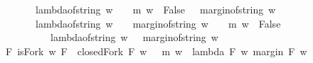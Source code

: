 \begin{isabellebody}
\ \ \ \ \ {\isasymand}\ \ \ {\isacharparenleft}lambda{\isacharunderscore}of{\isacharunderscore}string\ w\ {\isacharequal}\ {}\ {\isasymlongrightarrow}\ {\isacharparenleft}m\ {\isacharparenleft}w\ {\isacharat}\ {\isacharbrackleft}False{\isacharbrackright}{\isacharparenright}\ {\isacharequal}\ {\isacharparenleft}{}{\isacharcomma}\ margin{\isacharunderscore}of{\isacharunderscore}string\ w\ {\isacharminus}\ {}{\isacharparenright}{\isacharparenright}{\isacharparenright}\isanewline
\ \ \ \ \ {\isasymand}\ \ \ {\isacharparenleft}lambda{\isacharunderscore}of{\isacharunderscore}string\ w\ {\isachargreater}\ {}\ {\isasymand}\ margin{\isacharunderscore}of{\isacharunderscore}string\ w\ {\isasymnoteq}\ {}\ {\isasymlongrightarrow}\ {\isacharparenleft}m\ {\isacharparenleft}w\ {\isacharat}\ {\isacharbrackleft}False{\isacharbrackright}{\isacharparenright}\ \isanewline
\ \ \ \ \ \ \ \ \ \ {\isacharequal}\ {\isacharparenleft}lambda{\isacharunderscore}of{\isacharunderscore}string\ w\ {\isacharminus}\ {}{\isacharcomma}\ margin{\isacharunderscore}of{\isacharunderscore}string\ w\ {\isacharminus}\ {}{\isacharparenright}{\isacharparenright}{\isacharparenright}{\isacharparenright}{\isacharparenright}\ \isanewline
{\isasymand}\ {\isacharparenleft}{\isasymexists}\ F{\isachardot}\ {\isacharparenleft}isFork\ w\ F\ {\isasymand}\ closedFork\ F\ w\ \ {\isasymand}\ {\isacharparenleft}m\ w\ {\isacharequal}\ {\isacharparenleft}lambda\ F\ w{\isacharcomma}\ margin\ F\ w{\isacharparenright}{\isacharparenright}{\isacharparenright}{\isacharparenright}{\isacharparenright}{\isachardoublequoteclose}\isanewline
%
\isadelimproof
\ \ %
\endisadelimproof
%
\isatagproof
{}\isamarkupfalse%
%
\endisatagproof
{\isafoldproof}%
%
\isadelimproof
\isanewline
%
\endisadelimproof
%
\isadelimtheory
\ \ \ \ \isanewline
%
\endisadelimtheory
%
\isatagtheory
{}\isamarkupfalse%
%
\endisatagtheory
{\isafoldtheory}%
%
\isadelimtheory
%
\endisadelimtheory
%
\end{isabellebody}%
